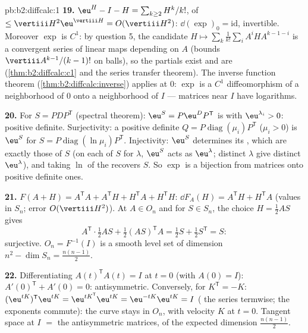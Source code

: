 \begin{solution}{pb:b2:diffcalc:1}
\textbf{19.} $\eu^H - I - H = \sum_{k\geq2}H^k/k!$, of 
$\leq \vertiii H^2\eu^{\vertiii H} = O(\vertiii H^2)$:
$\dd(\exp)_0 = \mathrm{id}$, invertible. Moreover $\exp$ is
$C^1$: by question 5, the  candidate $H \mapsto
\sum_k\frac1{k!}\sum_iA^iHA^{k-1-i}$ is a  convergent
series of linear maps depending  on $A$ (bounds
$\vertiii A^{k-1}/(k-1)!$ on balls), so the partials exist and
are  (\cref{thm:b2:diffcalc:c1} and the series
transfer theorem). The inverse function theorem
(\cref{thm:b2:diffcalc:inverse}) applies at $0$: $\exp$ is a
$C^1$ diffeomorphism of a neighborhood of $0$ onto a
neighborhood of $I$ --- matrices near $I$ have logarithms.

\textbf{20.} For  $S = PDP^{\mathsf T}$ (spectral
theorem): $\eu^S = P\eu^DP^{\mathsf T}$ is  with
 $\eu^{\lambda_i} > 0$: positive definite.
Surjectivity: a positive definite $Q =
P\operatorname{diag}(\mu_i)P^{\mathsf T}$ ($\mu_i > 0$) is
$\eu^S$ for $S = P\operatorname{diag}(\ln\mu_i)P^{\mathsf T}$.
Injectivity: $\eu^S$ determines its , which are
exactly those of $S$ (on each  of $S$ for $\lambda$,
$\eu^S$ acts as $\eu^\lambda$; distinct $\lambda$ give
distinct $\eu^\lambda$), and taking $\ln$ of the 
recovers $S$. So $\exp$ is a bijection from  matrices
onto positive definite ones.

\textbf{21.} $F(A + H) = A^{\mathsf T}A + A^{\mathsf T}H +
H^{\mathsf T}A + H^{\mathsf T}H$: $\dd F_A(H) =
A^{\mathsf T}H + H^{\mathsf T}A$ (values in $S_n$; error
$O(\vertiii H^2)$). At $A \in O_n$ and for $S \in S_n$, the
choice $H = \frac12AS$ gives
\[
A^{\mathsf T}\cdot\tfrac12AS + \tfrac12(AS)^{\mathsf T}A
= \tfrac12 S + \tfrac12 S^{\mathsf T} = S :
\]
surjective. $O_n = F^{-1}(I)$ is a smooth level set of
dimension $n^2 - \dim S_n = \frac{n(n-1)}2$.

\textbf{22.} Differentiating $A(t)^{\mathsf T}A(t) = I$ at $t
= 0$ (with $A(0) = I$): $A'(0)^{\mathsf T} + A'(0) = 0$:
antisymmetric. Conversely, for $K^{\mathsf T} = -K$:
$(\eu^{tK})^{\mathsf T}\eu^{tK} = \eu^{tK^{\mathsf T}}
\eu^{tK} = \eu^{-tK}\eu^{tK} = I$ ( the series
termwise; the exponents commute): the curve stays in $O_n$,
with velocity $K$ at $t = 0$. Tangent space at $I$ $=$ the
antisymmetric matrices, of the expected dimension
$\frac{n(n-1)}2$.


\end{solution}
